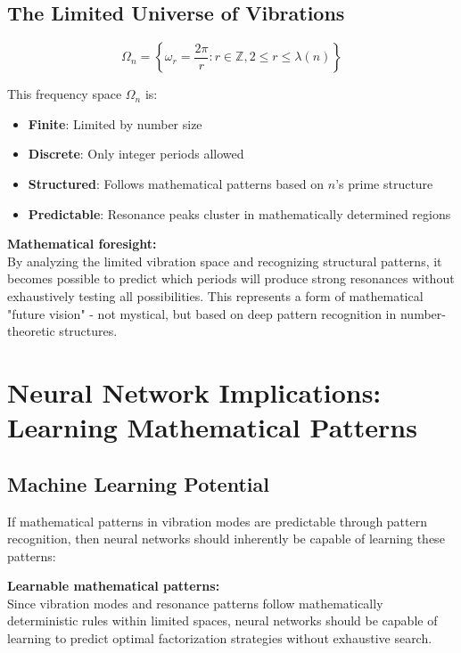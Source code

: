 	\subsection{The Limited Universe of Vibrations}
	
	\begin{equation}
		\Omega_n = \left\{\omega_r = \frac{2\pi}{r} : r \in \mathbb{Z}, 2 \leq r \leq \lambda(n)\right\}
	\end{equation}
	
	This frequency space $\Omega_n$ is:
	\begin{itemize}
		\item \textbf{Finite}: Limited by number size
		\item \textbf{Discrete}: Only integer periods allowed
		\item \textbf{Structured}: Follows mathematical patterns based on $n$'s prime structure
		\item \textbf{Predictable}: Resonance peaks cluster in mathematically determined regions
	\end{itemize}
	
	\begin{tcolorbox}[colback=cyan!10,colframe=cyan!50,title=Prediction Principle]
		\textbf{Mathematical foresight:} \\
		By analyzing the limited vibration space and recognizing structural patterns, it becomes possible to predict which periods will produce strong resonances without exhaustively testing all possibilities. This represents a form of mathematical "future vision" - not mystical, but based on deep pattern recognition in number-theoretic structures.
	\end{tcolorbox}
	
	\section{Neural Network Implications: Learning Mathematical Patterns}
	
	\subsection{Machine Learning Potential}
	
	If mathematical patterns in vibration modes are predictable through pattern recognition, then neural networks should inherently be capable of learning these patterns:
	
	\begin{tcolorbox}[colback=green!10,colframe=green!50,title=Neural Network Hypothesis]
		\textbf{Learnable mathematical patterns:} \\
		Since vibration modes and resonance patterns follow mathematically deterministic rules within limited spaces, neural networks should be capable of learning to predict optimal factorization strategies without exhaustive search.
	\end{tcolorbox}
	
